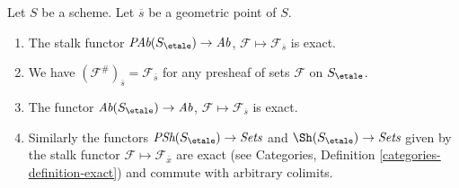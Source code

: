 \begin{lemma}
\label{lemma-stalk-exact}
Let $S$ be a scheme. Let $\overline{s}$ be a geometric point of $S$.
\begin{enumerate}
\item The stalk functor
$\textit{PAb}(S_\etale) \to \textit{Ab}$,
$\mathcal{F}  \mapsto  \mathcal{F}_{\overline{s}}$
is exact.
\item We have $(\mathcal{F}^\#)_{\overline{s}} = \mathcal{F}_{\overline{s}}$
for any presheaf of sets $\mathcal{F}$ on $S_\etale$.
\item The functor
$\textit{Ab}(S_\etale) \to \textit{Ab}$,
$\mathcal{F} \mapsto \mathcal{F}_{\overline{s}}$ is exact.
\item Similarly the functors
$\textit{PSh}(S_\etale) \to \textit{Sets}$ and
$\Sh(S_\etale) \to \textit{Sets}$ given by the stalk functor
$\mathcal{F} \mapsto \mathcal{F}_{\overline{x}}$ are exact (see
Categories, Definition \ref{categories-definition-exact})
and commute with arbitrary colimits.
\end{enumerate}
\end{lemma}

